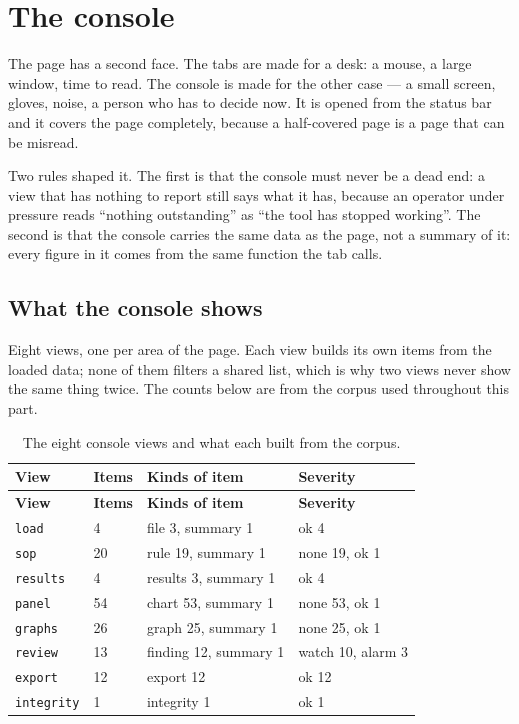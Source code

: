 \chapter{The console}\label{ch:console}

The page has a second face. The tabs are made for a desk: a mouse, a large
window, time to read. The console is made for the other case --- a small screen,
gloves, noise, a person who has to decide now. It is opened from the status bar
and it covers the page completely, because a half-covered page is a page that can
be misread.

Two rules shaped it. The first is that the console must never be a dead end: a
view that has nothing to report still says what it has, because an operator under
pressure reads ``nothing outstanding'' as ``the tool has stopped working''. The
second is that the console carries the same data as the page, not a summary of it:
every figure in it comes from the same function the tab calls.

\section{What the console shows}
Eight views, one per area of the page. Each view builds its own items from the
loaded data; none of them filters a shared list, which is why two views never show
the same thing twice. The counts below are from the corpus used throughout this
part.

{\small
\begin{xltabular}{\linewidth}{|X|X|X|X|}
\caption{The eight console views and what each built from the corpus.}\label{tab:console-views} \\
\toprule \textbf{View} & \textbf{Items} & \textbf{Kinds of item} & \textbf{Severity} \\\midrule\endfirsthead
\toprule \textbf{View} & \textbf{Items} & \textbf{Kinds of item} & \textbf{Severity} \\\midrule\endhead
\texttt{load} & 4 & file 3, summary 1 & ok 4 \\
\texttt{sop} & 20 & rule 19, summary 1 & none 19, ok 1 \\
\texttt{results} & 4 & results 3, summary 1 & ok 4 \\
\texttt{panel} & 54 & chart 53, summary 1 & none 53, ok 1 \\
\texttt{graphs} & 26 & graph 25, summary 1 & none 25, ok 1 \\
\texttt{review} & 13 & finding 12, summary 1 & watch 10, alarm 3 \\
\texttt{export} & 12 & export 12 & ok 12 \\
\texttt{integrity} & 1 & integrity 1 & ok 1 \\
\bottomrule
\end{xltabular}}


